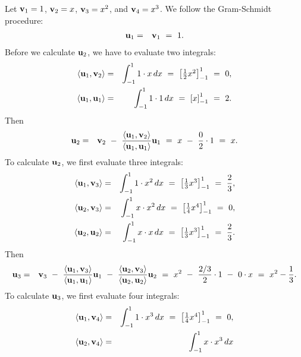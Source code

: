 \begin{solution}
  Let $\vect{v}_1=1$, $\vect{v}_2=x$, $\vect{v}_3=x^2$, and
  $\vect{v}_4=x^3$. We follow the Gram-Schmidt procedure:
  \begin{eqnarray*}
    \vect{u}_1
    &=& \vect{v}_1
        ~=~ 1.
  \end{eqnarray*}
  Before we calculate $\vect{u}_2$, we have to evaluate two integrals:
  \begin{eqnarray*}
    \iprod{\vect{u}_1,\vect{v}_2}
    &=& \int_{-1}^{1} 1\cdot x\,dx
    ~=~ \bigbracket{\textstyle\frac{1}{2}x^2}_{-1}^{1}
    ~=~ 0,
    \\
    \iprod{\vect{u}_1,\vect{u}_1}
    &=& \int_{-1}^{1} 1\cdot 1\,dx
    ~=~ \bigbracket{x}_{-1}^{1}
    ~=~ 2.
  \end{eqnarray*}
  Then
  \begin{eqnarray*}
    \vect{u}_2
    &=& \vect{v}_2 ~-~ \frac{\iprod{\vect{u}_1,\vect{v}_2}}{\iprod{\vect{u}_1,\vect{u}_1}}\vect{u}_1
    ~=~ x ~-~ \frac{0}{2}\cdot 1 ~=~ x.
  \end{eqnarray*}
  To calculate $\vect{u}_2$, we first evaluate three integrals:
  \begin{eqnarray*}
    \iprod{\vect{u}_1,\vect{v}_3}
    &=& \int_{-1}^{1} 1\cdot x^2\,dx
    ~=~ \bigbracket{\textstyle\frac{1}{3}x^3}_{-1}^{1}
    ~=~ \frac{2}{3},
    \\
    \iprod{\vect{u}_2,\vect{v}_3}
    &=& \int_{-1}^{1} x\cdot x^2\,dx
    ~=~ \bigbracket{\textstyle\frac{1}{4}x^4}_{-1}^{1}
    ~=~ 0,
    \\
    \iprod{\vect{u}_2,\vect{u}_2}
    &=& \int_{-1}^{1} x\cdot x\,dx
    ~=~ \bigbracket{\textstyle\frac{1}{3}x^3}_{-1}^{1}
    ~=~ \frac{2}{3}.
  \end{eqnarray*}
  Then
  \begin{eqnarray*}
    \vect{u}_3
    &=& \vect{v}_3
        ~-~ \frac{\iprod{\vect{u}_1,\vect{v}_3}}{\iprod{\vect{u}_1,\vect{u}_1}}\vect{u}_1
        ~-~ \frac{\iprod{\vect{u}_2,\vect{v}_3}}{\iprod{\vect{u}_2,\vect{u}_2}}\vect{u}_2
        ~=~ x^2 ~-~ \frac{2/3}{2}\cdot 1 ~-~ 0\cdot x
        ~=~ x^2 - \frac{1}{3}.
  \end{eqnarray*}
  To calculate $\vect{u}_3$, we first evaluate four integrals:
  \begin{eqnarray*}
    \iprod{\vect{u}_1,\vect{v}_4}
    &=& \int_{-1}^{1} 1\cdot x^3\,dx
    ~=~ \bigbracket{\textstyle\frac{1}{4}x^4}_{-1}^{1}
    ~=~ 0,
    \\
    \iprod{\vect{u}_2,\vect{v}_4}
    &=& \int_{-1}^{1} x\cdot x^3\,dx

\end{eqnarray*}
\end{solution}
